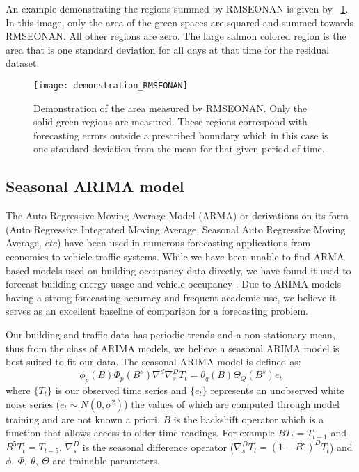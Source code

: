 An example demonstrating the regions summed by RMSEONAN is given by ~\ref{fig:dem_RMSEONAN}.  In this image, only the area of the green spaces are squared and summed towards RMSEONAN.  All other regions are zero.  The large salmon colored region is the area that is one standard deviation for all days at that time for the residual dataset.

\begin{figure}[t]
	\begin{center}
		\texttt{[image: demonstration\_RMSEONAN]}
	\end{center}
	\caption{Demonstration of the area measured by RMSEONAN.  Only the solid green regions are measured.  These regions correspond with forecasting errors outside a prescribed boundary which in this case is one standard deviation from the mean for that given period of time.}
	\label{fig:dem_RMSEONAN}
\end{figure}

\subsection{Seasonal ARIMA model}
The Auto Regressive Moving Average Model (ARMA) or derivations on its form (Auto Regressive Integrated Moving Average, Seasonal Auto Regressive Moving Average, $etc$) have been used in numerous forecasting applications from economics to vehicle traffic systems.  While we have been unable to find ARMA based models used on building occupancy data directly, we have found it used to forecast building energy usage and vehicle occupancy \cite{Williams2003, Hong2011, Newsham2010, Howard2013, Fernandez2011}.  Due to ARIMA models having a strong forecasting accuracy and frequent academic use, we believe it serves as an excellent baseline of comparison for a forecasting problem.  

Our building and traffic data has periodic trends and a non stationary mean, thus from the class of ARIMA models, we believe a seasonal ARIMA model is best suited to fit our data.  The seasonal ARIMA model is defined as:
\begin{equation}
\label{eq:sarima}
\phi_{p}(B)\Phi_{p}(B^{s})\nabla^{d}\nabla^{D}_{s}T_{t} = \theta_{q}(B)\Theta_{Q}(B^{s})e_{t}
\end{equation}
\noindent
where $\{T_{t}\}$ is our observed time series and $\{e_t\}$ represents an unobserved white noise series ($e_{t} \sim N(0, \sigma^{2})$) the values of which are computed through model training and are not known a priori.  $B$ is the backshift operator which is a function that allows access to older time readings.  For example $BT_{t} = T_{t-1}$ and $B^{5}T_{t} = T_{t-5}$.  $\nabla^{D}_{s}$ is the seasonal difference operator ($\nabla^{D}_{s}T_{t} = (1 - B^{s})^{D}T_{t}$) and $\phi,\  \Phi,\  \theta,\ \Theta$ are trainable parameters.  

